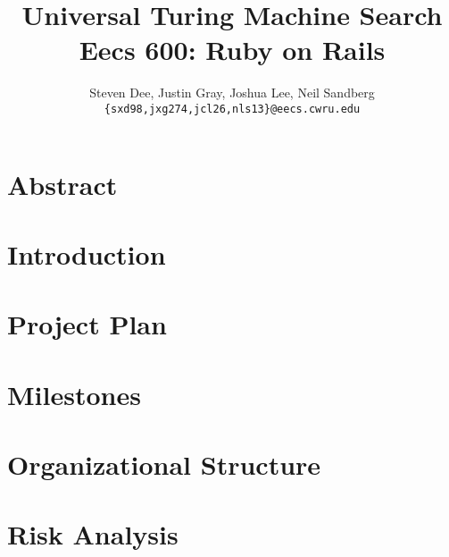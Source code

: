 \documentclass{article}
\title{Universal Turing Machine Search\\
\Large {\sc Eecs} 600: Ruby on Rails}
\author{Steven Dee, Justin Gray, Joshua Lee, Neil Sandberg \\
\tt \{sxd98,jxg274,jcl26,nls13\}@eecs.cwru.edu}
\begin{document}
\maketitle

\section{Abstract}

\section{Introduction}

\section{Project Plan}

\section{Milestones}

\section{Organizational Structure}

\section{Risk Analysis}



\end{document}
